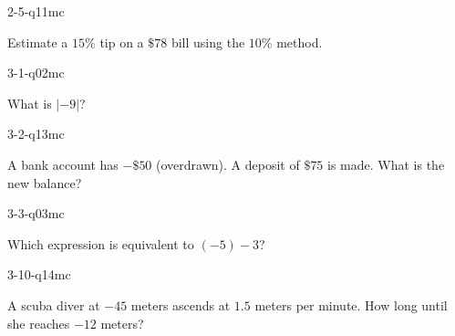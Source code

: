\begin{practiceQuestion}{2-5-q11}{mc}
\begin{questionText}
Estimate a $15\%$ tip on a $\$78$ bill using the $10\%$ method.
\end{questionText}
\end{practiceQuestion}

\begin{practiceQuestion}{3-1-q02}{mc}
\begin{questionText}
What is $|-9|$?
\end{questionText}
\end{practiceQuestion}

\begin{practiceQuestion}{3-2-q13}{mc}
\begin{questionText}
A bank account has $-\$50$ (overdrawn). A deposit of $\$75$ is made. What is the new balance?
\end{questionText}
\end{practiceQuestion}

\begin{practiceQuestion}{3-3-q03}{mc}
\begin{questionText}
Which expression is equivalent to $(-5) - 3$?
\end{questionText}
\end{practiceQuestion}

\begin{practiceQuestion}{3-10-q14}{mc}
\begin{questionText}
A scuba diver at $-45$ meters ascends at $1.5$ meters per minute. How long until she reaches $-12$ meters?
\end{questionText}
\end{practiceQuestion}

